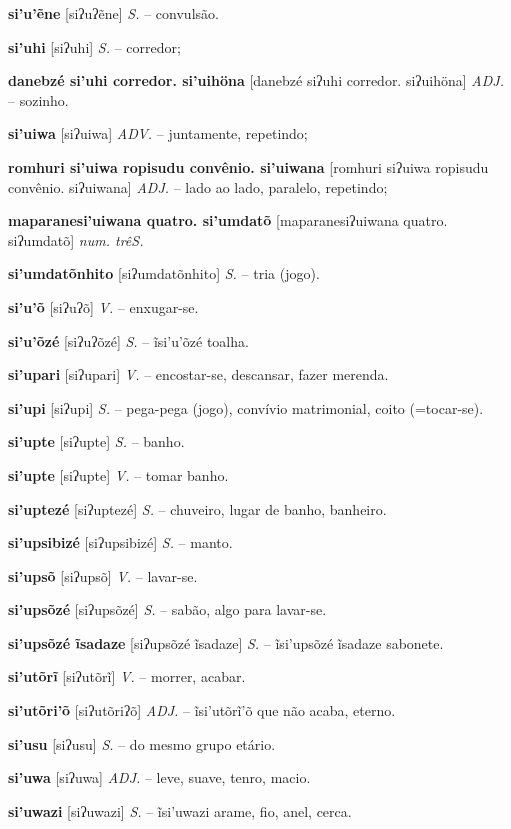 \textbf{si'u'ẽne} [siʔuʔẽne] \textit{S.} -- convulsão.

\textbf{si'uhi} [siʔuhi] \textit{S.} -- corredor;

\textbf{danebzé si'uhi corredor. si'uihöna} [danebzé siʔuhi corredor. siʔuihöna] \textit{ADJ.} -- sozinho.

\textbf{si'uiwa} [siʔuiwa] \textit{ADV.} -- juntamente, repetindo;

\textbf{romhuri si'uiwa ropisudu convênio. si'uiwana} [romhuri siʔuiwa ropisudu convênio. siʔuiwana] \textit{ADJ.} -- lado ao lado, paralelo, repetindo;

\textbf{maparanesi'uiwana quatro. si'umdatõ} [maparanesiʔuiwana quatro. siʔumdatõ] \textit{num. trêS.}

\textbf{si'umdatõnhito} [siʔumdatõnhito] \textit{S.} -- tria (jogo).

\textbf{si'u'õ} [siʔuʔõ] \textit{V.} -- enxugar-se.

\textbf{si'u'õzé} [siʔuʔõzé] \textit{S.} -- ĩsi'u'õzé toalha.

\textbf{si'upari} [siʔupari] \textit{V.} -- encostar-se, descansar, fazer merenda.

\textbf{si'upi} [siʔupi] \textit{S.} -- pega-pega (jogo), convívio matrimonial, coito (=tocar-se).

\textbf{si'upte} [siʔupte] \textit{S.} -- banho.

\textbf{si'upte} [siʔupte] \textit{V.} -- tomar banho.

\textbf{si'uptezé} [siʔuptezé] \textit{S.} -- chuveiro, lugar de banho, banheiro.

\textbf{si'upsibizé} [siʔupsibizé] \textit{S.} -- manto.

\textbf{si'upsõ} [siʔupsõ] \textit{V.} -- lavar-se.

\textbf{si'upsõzé} [siʔupsõzé] \textit{S.} -- sabão, algo para lavar-se.

\textbf{si'upsõzé ĩsadaze} [siʔupsõzé ĩsadaze] \textit{S.} -- ĩsi'upsõzé ĩsadaze sabonete.

\textbf{si'utõrĩ} [siʔutõrĩ] \textit{V.} -- morrer, acabar.

\textbf{si'utõri'õ} [siʔutõriʔõ] \textit{ADJ.} -- ĩsi'utõrĩ'õ que não acaba, eterno.

\textbf{si'usu} [siʔusu] \textit{S.} -- do mesmo grupo etário.

\textbf{si'uwa} [siʔuwa] \textit{ADJ.} -- leve, suave, tenro, macio.

\textbf{si'uwazi} [siʔuwazi] \textit{S.} -- ĩsi'uwazi arame, fio, anel, cerca.

